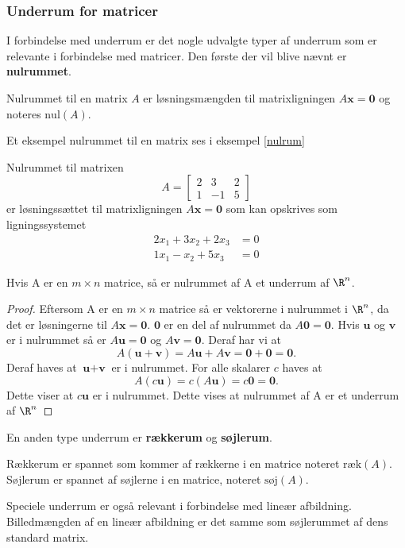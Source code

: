 \subsubsection{Underrum for matricer}
I forbindelse med underrum er det nogle udvalgte typer af underrum som er relevante i forbindelse med matricer. Den første der vil blive nævnt er \textbf{nulrummet}.
\begin{defn}{}{}
Nulrummet til en matrix $A$ er løsningsmængden til matrixligningen $A\textbf{x}=\textbf{0}$ og noteres $\text{nul}(A)$. 
\end{defn}
Et eksempel nulrummet til en matrix ses i eksempel \ref{nulrum}

\begin{eks}\label{nulrum}
Nulrummet til matrixen
$$A=\begin{bmatrix}
2 & 3 & 2\\
1 & -1 & 5
\end{bmatrix}$$
er løsningssættet til matrixligningen $A\textbf{x}=\textbf{0}$
som kan opskrives som ligningssystemet
\begin{align*}
2x_1+3x_2+2x_3&=0\\
1x_1-x_2+5x_3&=0
\end{align*}
\end{eks} 
\begin{thm}{}{}
Hvis A er en $m\times n$ matrice, så er nulrummet af A et underrum af $\R^n$.
\end{thm}
\begin{proof}
Eftersom A er en $m\times n$ matrice så er vektorerne i nulrummet i $\R^n$, da det er løsningerne til $A\textbf{x}=\textbf{0}$. $\textbf{0}$ er en del af nulrummet da $A\textbf{0}=\textbf{0}$. Hvis $\textbf{u}$ og $\textbf{v}$ er i nulrummet så er $A\textbf{u}=\textbf{0}$ og $A\textbf{v}=\textbf{0}$. Deraf har vi at
$$A(\textbf{u}+\textbf{v})=A\textbf{u}+A\textbf{v}=\textbf{0}+\textbf{0}=\textbf{0}.$$
Deraf haves at $\textbf{u}+\textbf{v}$ er i nulrummet. For alle skalarer $c$ haves at
$$A(c\textbf{u})=c(A\textbf{u})=c\textbf{0}=\textbf{0}.$$
Dette viser at $c\textbf{u}$ er i nulrummet.
Dette vises at nulrummet af A er et underrum af $\R^n$
\end{proof}
\noindent
En anden type underrum er \textbf{rækkerum} og \textbf{søjlerum}.
\begin{defn}{}{}
Rækkerum er spannet som kommer af rækkerne i en matrice noteret $\text{ræk}(A)$.\\
Søjlerum er spannet af søjlerne i en matrice, noteret $\text{søj}(A)$.
\end{defn}
\noindent
Speciele underrum er også relevant i forbindelse med lineær afbildning.
Billedmængden af en lineær afbildning er det samme som søjlerummet af dens standard matrix.


